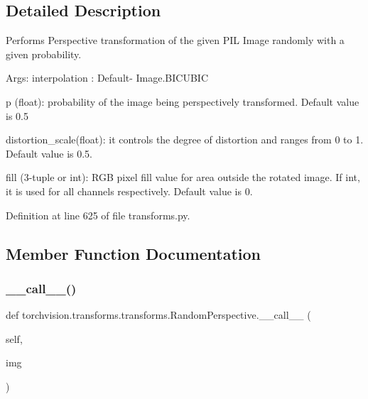 \subsection{Detailed Description}
\begin{DoxyVerb}Performs Perspective transformation of the given PIL Image randomly with a given probability.

Args:
    interpolation : Default- Image.BICUBIC

    p (float): probability of the image being perspectively transformed. Default value is 0.5

    distortion_scale(float): it controls the degree of distortion and ranges from 0 to 1. Default value is 0.5.

    fill (3-tuple or int): RGB pixel fill value for area outside the rotated image.
        If int, it is used for all channels respectively. Default value is 0.
\end{DoxyVerb}
 

Definition at line 625 of file transforms.\+py.



\subsection{Member Function Documentation}
\mbox{\label{classtorchvision_1_1transforms_1_1transforms_1_1RandomPerspective_ab795687134e8cde452910c968763382a}} 
\subsubsection{\texorpdfstring{\+\_\+\+\_\+call\+\_\+\+\_\+()}{\_\_call\_\_()}}
{\footnotesize\ttfamily def torchvision.\+transforms.\+transforms.\+Random\+Perspective.\+\_\+\+\_\+call\+\_\+\+\_\+ (\begin{DoxyParamCaption}\item[{}]{self,  }\item[{}]{img }\end{DoxyParamCaption})}

